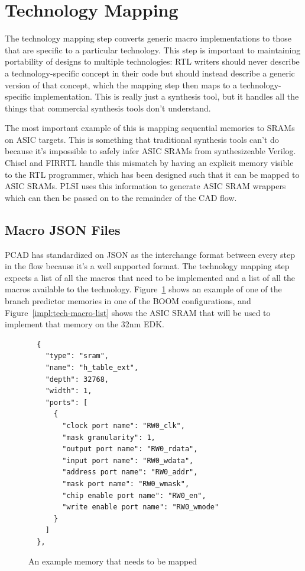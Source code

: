 \documentclass{article}
\begin{document}
\section{Technology Mapping}

The technology mapping step converts generic macro implementations to those
that are specific to a particular technology.  This step is important to
maintaining portability of designs to multiple technologies: RTL writers should
never describe a technology-specific concept in their code but should instead
describe a generic version of that concept, which the mapping step then maps to
a technology-specific implementation.  This is really just a synthesis tool,
but it handles all the things that commercial synthesis tools don't understand.

The most important example of this is mapping sequential memories to SRAMs on
ASIC targets.  This is something that traditional synthesis tools can't do
because it's impossible to safely infer ASIC SRAMs from synthesizeable Verilog.
Chisel and FIRRTL handle this mismatch by having an explicit memory visible to
the RTL programmer, which has been designed such that it can be mapped to ASIC
SRAMs.  PLSI uses this information to generate ASIC SRAM wrappers which can
then be passed on to the remainder of the CAD flow.

\subsection{Macro JSON Files}

PCAD has standardized on JSON as the interchange format between every step in
the flow because it's a well supported format.  The technology mapping step
expects a list of all the macros that need to be implemented and a list of all
the macros available to the technology.  Figure~\ref{impl:core-macro-list}
shows an example of one of the branch predictor memories in one of the BOOM
configurations, and Figure~\ref{impl:tech-macro-list} shows the ASIC SRAM that
will be used to implement that memory on the 32nm EDK.  

\begin{figure}
\begin{verbatim}
  {
    "type": "sram",
    "name": "h_table_ext",
    "depth": 32768,
    "width": 1,
    "ports": [
      {
        "clock port name": "RW0_clk",
        "mask granularity": 1,
        "output port name": "RW0_rdata",
        "input port name": "RW0_wdata",
        "address port name": "RW0_addr",
        "mask port name": "RW0_wmask",
        "chip enable port name": "RW0_en",
        "write enable port name": "RW0_wmode"
      }
    ]
  },
\end{verbatim}
  \caption{An example memory that needs to be mapped}
  \label{impl:core-macro-list}
\end{figure}
\end{document}
